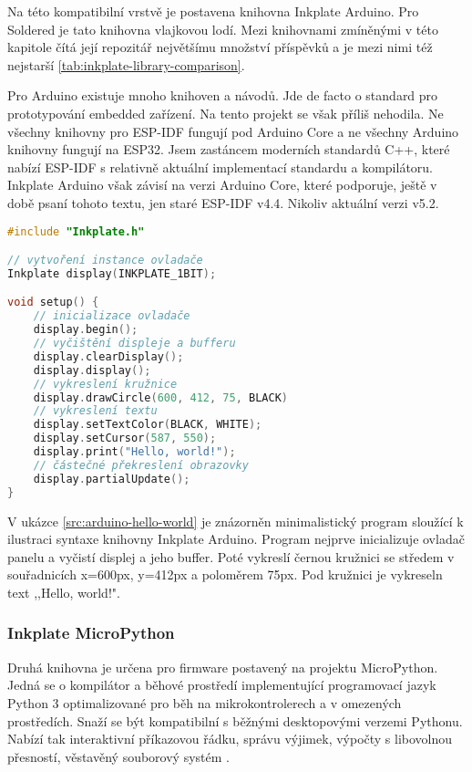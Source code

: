 Na této kompatibilní vrstvě je postavena knihovna Inkplate Arduino. Pro Soldered je tato knihovna vlajkovou lodí. Mezi knihovnami zmíněnými v této kapitole čítá její repozitář největšímu množství příspěvků a je mezi nimi též nejstarší \ref{tab:inkplate-library-comparison}.

Pro Arduino existuje mnoho knihoven a návodů. Jde de facto o standard pro prototypování embedded zařízení. Na tento projekt se však příliš nehodila. Ne všechny knihovny pro ESP-IDF fungují pod Arduino Core a ne všechny Arduino knihovny fungují na ESP32. Jsem zastáncem moderních standardů C++, které nabízí ESP-IDF s relativně aktuální implementací standardu a kompilátoru. Inkplate Arduino však závisí na verzi Arduino Core, které podporuje, ještě v době psaní tohoto textu, jen staré ESP-IDF v4.4. Nikoliv aktuální verzi v5.2.

\begin{lstlisting}[label=src:arduino-hello-world,language=C++,caption={Ilustrační použití knihovny Inkplate Arduino}]
#include "Inkplate.h"

// vytvoření instance ovladače
Inkplate display(INKPLATE_1BIT);

void setup() {
    // inicializace ovladače
    display.begin();
    // vyčištění displeje a bufferu
    display.clearDisplay();
    display.display();
    // vykreslení kružnice
    display.drawCircle(600, 412, 75, BLACK)
    // vykreslení textu
    display.setTextColor(BLACK, WHITE);
    display.setCursor(587, 550);
    display.print("Hello, world!");
    // částečné překreslení obrazovky
    display.partialUpdate();
}
\end{lstlisting}

V ukázce \ref{src:arduino-hello-world} je znázorněn minimalistický program sloužící k ilustraci syntaxe knihovny Inkplate Arduino. Program nejprve inicializuje ovladač panelu a vyčistí displej a jeho buffer. Poté vykreslí černou kružnici se středem v souřadnicích x=600px, y=412px a poloměrem 75px. Pod kružnici je vykreseln text ,,Hello, world!".

\subsubsection{Inkplate MicroPython}
Druhá knihovna je určena pro firmware postavený na projektu MicroPython. Jedná se o kompilátor a běhové prostředí implementující programovací jazyk Python 3 optimalizované pro běh na mikrokontrolerech a v omezených prostředích. Snaží se být kompatibilní s běžnými desktopovými verzemi Pythonu. Nabízí tak interaktivní příkazovou řádku, správu výjimek, výpočty s libovolnou přesností, věstavěný souborový systém \cite{MicroPythonPythonMicrocontrollers}.

